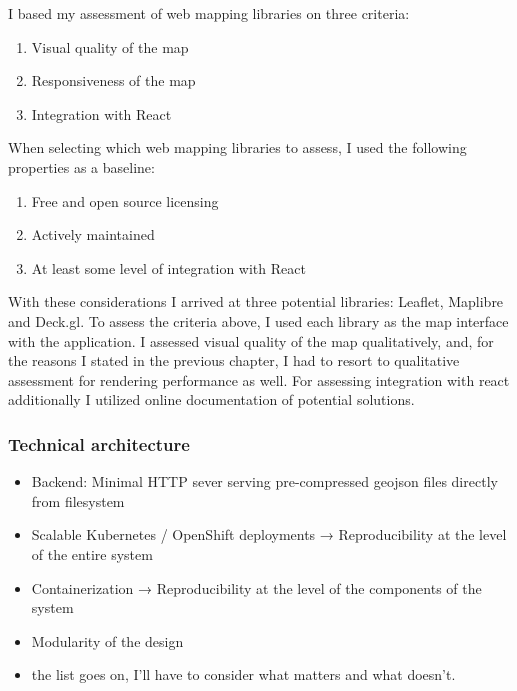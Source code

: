 I based my assessment of web mapping libraries on three criteria:
\begin{enumerate}
	\item Visual quality of the map
	\item Responsiveness of the map
	\item Integration with React
\end{enumerate}

When selecting which web mapping libraries to assess, I used the following properties as a baseline:
\begin{enumerate}
	\item Free and open source licensing
	\item Actively maintained
	\item At least some level of integration with React
\end{enumerate}

With these considerations I arrived at three potential libraries:
Leaflet, Maplibre and Deck.gl.
To assess the criteria above,
I used each library as the map interface with the application.
I assessed visual quality of the map qualitatively, and, for the reasons I stated in the previous chapter,
I had to resort to qualitative assessment for rendering performance as well.
For assessing integration with react additionally I utilized online documentation of potential solutions.



\subsubsection{Technical architecture}

\begin{itemize}
	\item Backend: Minimal HTTP sever serving pre-compressed geojson files directly from filesystem
	\item Scalable Kubernetes / OpenShift deployments → Reproducibility at the level of the entire system
	\item Containerization → Reproducibility at the level of the components of the system
	\item Modularity of the design
	\item the list goes on, I'll have to consider what matters and what doesn't.
\end{itemize}

